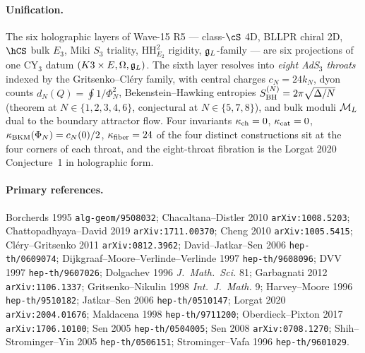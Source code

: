 \paragraph{Unification.}
The six holographic layers of Wave-15 R5 --- class-$\cS$ 4D,
BLLPR chiral 2D, $\hCS$ bulk $E_3$, Miki $S_3$ triality,
$\mathrm{HH}^2_{E_2}$ rigidity, $\mathfrak{g}_{L}$-family --- are six projections
of one CY$_3$ datum $(K3\times E,\Omega,\mathfrak{g}_{L})$. The sixth layer
resolves into \emph{eight AdS$_3$ throats} indexed by the
Gritsenko--Cl\'ery family, with central charges $c_N=24 k_N$,
dyon counts $d_N(Q)=\oint 1/\Phi_N^2$, Bekenstein--Hawking
entropies $S_{\mathrm{BH}}^{(N)}=2\pi\sqrt{\Delta/N}$ (theorem at
$N\in\{1,2,3,4,6\}$, conjectural at $N\in\{5,7,8\}$), and bulk
moduli $\mathcal{M}_L$ dual to the boundary attractor flow. Four
invariants $\kappa_{\mathrm{ch}}=0$, $\kappa_{\mathrm{cat}}=0$, $\kappa_{\mathrm{BKM}}(\Phi_N)=c_N(0)/2$, $\kappa_{\mathrm{fiber}}=24$
of the four distinct constructions sit at the four
corners of each throat, and the eight-throat fibration is the
Lorgat 2020 Conjecture~1 in holographic form.

\paragraph{Primary references.}
Borcherds 1995 \texttt{alg-geom/9508032};
Chacaltana--Distler 2010 \texttt{arXiv:1008.5203};
Chattopadhyaya--David 2019 \texttt{arXiv:1711.00370};
Cheng 2010 \texttt{arXiv:1005.5415};
Cl\'ery--Gritsenko 2011 \texttt{arXiv:0812.3962};
David--Jatkar--Sen 2006 \texttt{hep-th/0609074};
Dijkgraaf--Moore--Verlinde--Verlinde 1997 \texttt{hep-th/9608096};
DVV 1997 \texttt{hep-th/9607026};
Dolgachev 1996 \emph{J.\ Math.\ Sci.} 81;
Garbagnati 2012 \texttt{arXiv:1106.1337};
Gritsenko--Nikulin 1998 \emph{Int.\ J.\ Math.} 9;
Harvey--Moore 1996 \texttt{hep-th/9510182};
Jatkar--Sen 2006 \texttt{hep-th/0510147};
Lorgat 2020 \texttt{arXiv:2004.01676};
Maldacena 1998 \texttt{hep-th/9711200};
Oberdieck--Pixton 2017 \texttt{arXiv:1706.10100};
Sen 2005 \texttt{hep-th/0504005};
Sen 2008 \texttt{arXiv:0708.1270};
Shih--Strominger--Yin 2005 \texttt{hep-th/0506151};
Strominger--Vafa 1996 \texttt{hep-th/9601029}.

